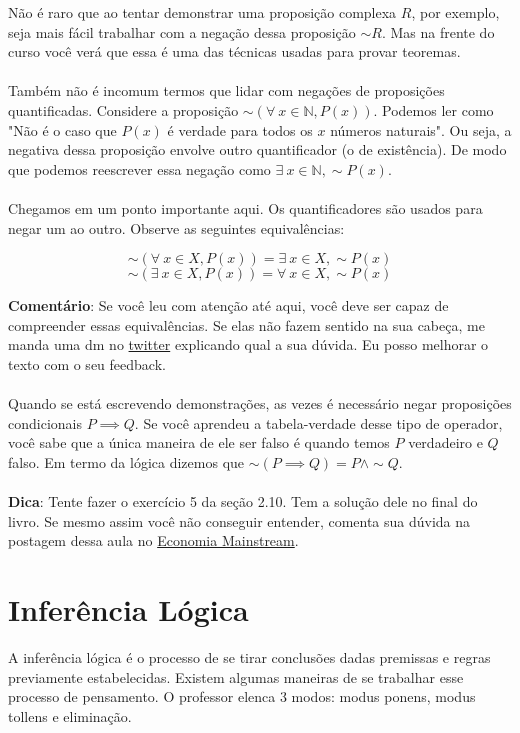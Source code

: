 \documentclass[a4paper,11pt]{book}
\theoremstyle{definition}
\theoremstyle{break}
\begin{document}
Não é raro que ao tentar demonstrar uma proposição complexa $R$, por exemplo, seja mais fácil trabalhar com a negação dessa proposição $\sim R$. Mas na frente do curso você verá que essa é uma das técnicas usadas para provar teoremas.
\\
\\
Também não é incomum termos que lidar com negações de proposições quantificadas. Considere a proposição $\sim(\forall \ x \in \mathbb{N}, P(x))$. Podemos ler como "Não é o caso que $P(x)$ é verdade para todos os $x$ números naturais". Ou seja, a negativa dessa proposição envolve outro quantificador (o de existência). De modo que podemos reescrever essa negação como $\exists \ x \in \mathbb{N},\sim P(x)$.
\\
\\
Chegamos em um ponto importante aqui. Os quantificadores são usados para negar um ao outro. Observe as seguintes equivalências:

$$ \sim (\forall \ x \in X, P(x)) = \exists \ x \in X, \sim P(x) $$
$$ \sim (\exists \ x \in X, P(x)) = \forall \ x \in X, \sim P(x) $$

\textbf{Comentário}: Se você leu com atenção até aqui, você deve ser capaz de compreender essas equivalências. Se elas não fazem sentido na sua cabeça, me manda uma dm no \href{https://twitter.com/bruno_ruas2}{twitter} explicando qual a sua dúvida. Eu posso melhorar o texto com o seu feedback.
\\
\\
Quando se está escrevendo demonstrações, as vezes é necessário negar proposições condicionais $P \implies Q$. Se você aprendeu a tabela-verdade desse tipo de operador, você sabe que a única maneira de ele ser falso é quando temos $P$ verdadeiro e $Q$ falso. Em termo da lógica dizemos que $\sim (P \implies Q) = P \land \sim Q$. 
\\
\\
\textbf{Dica}: Tente fazer o exercício 5 da seção 2.10. Tem a solução dele no final do livro. Se mesmo assim você não conseguir entender, comenta sua dúvida na postagem dessa aula no \href{https://economiamainstream.com.br/artigo/matematica/}{Economia Mainstream}.

\section{Inferência Lógica}

A inferência lógica é o processo de se tirar conclusões dadas premissas e regras previamente estabelecidas. Existem algumas maneiras de se trabalhar esse processo de pensamento. O professor elenca 3 modos: modus ponens, modus tollens e eliminação.
\end{document}
